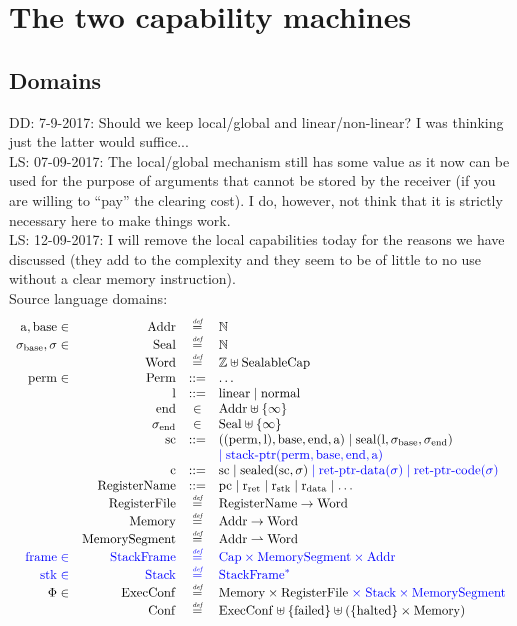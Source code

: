 \documentclass[a4paper]{article}
\newcommand\lau[1]{{\color{purple} \sf \footnotesize {LS: #1}}\\}
\newcommand\dominique[1]{{\color{purple} \sf \footnotesize {DD: #1}}\\}
\newcommand{\defeq}{\stackrel{\textit{\tiny{def}}}{=}}
\newcommand{\defbnf}{::=}
\newcommand{\fun}{\rightarrow}
\newcommand{\parfun}{\rightharpoonup}
\newcommand{\sourcecolor}[1]{\color{blue}}
\newcommand{\src}[1]{{\sourcecolor{} #1}}
\newcommand{\nats}{\mathbb{N}}
\newcommand{\ints}{\mathbb{Z}}
\newcommand{\shareddom}[1]{\mathrm{#1}}
\newcommand{\RegName}{\shareddom{RegisterName}}
\newcommand{\Addr}{\shareddom{Addr}}
\newcommand{\Seal}{\shareddom{Seal}}
\newcommand{\Perm}{\shareddom{Perm}}
\newcommand{\Caps}{\shareddom{Cap}}
\newcommand{\SealableCaps}{\shareddom{SealableCap}}
\newcommand{\Word}{\shareddom{Word}}
\newcommand{\Mem}{\shareddom{Memory}}
\newcommand{\Reg}{\shareddom{RegisterFile}}
\newcommand{\Conf}{\shareddom{Conf}}
\newcommand{\ExecConf}{\shareddom{ExecConf}}
\newcommand{\MemSeg}{\shareddom{MemorySegment}}
\newcommand{\StkFrame}{\shareddom{StackFrame}}
\newcommand{\Stack}{\shareddom{Stack}}
\newcommand{\scbnf}{\shareddom{sc}}
\newcommand{\cbnf}{\shareddom{c}}
\newcommand{\permbnf}{\shareddom{perm}}
\newcommand{\addrbnf}{\shareddom{a}}
\newcommand{\basebnf}{\shareddom{base}}
\newcommand{\aendbnf}{\shareddom{end}}
\newcommand{\linbnf}{\shareddom{l}}
\newcommand{\sealbasebnf}{\sigma_\shareddom{base}}
\newcommand{\sealendbnf}{\sigma_\shareddom{end}}
\newcommand{\sstk}{\shareddom{stk}}
\newcommand{\sstkframe}{\shareddom{frame}}
\newcommand{\stkptr}[1]{\mathrm{stack\text{-}ptr}(#1)}
\newcommand{\retptrd}{\mathrm{ret\text{-}ptr\text{-}data}}
\newcommand{\retptrc}{\mathrm{ret\text{-}ptr\text{-}code}}
\newcommand{\seal}[1]{\shareddom{seal}(#1)}
\newcommand{\sealed}[1]{\shareddom{sealed}(#1)}
\newcommand{\failed}{\mathrm{failed}}
\newcommand{\halted}{\mathrm{halted}}
\newcommand{\pcreg}{\mathrm{pc}}
\newcommand{\rstk}{\mathrm{r}_\mathrm{stk}}
\newcommand{\rO}{\mathrm{r}_\mathrm{ret}}
\newcommand{\rret}{\rO}
\newcommand{\rdata}{\mathrm{r}_\mathrm{data}}
\newcommand{\plainlinearity}[1]{\mathrm{#1}}
\newcommand{\linear}{\plainlinearity{linear}}
\newcommand{\normal}{\plainlinearity{normal}}
\begin{document}
\section{The two capability machines}
\subsection{Domains}
\label{sec:domains}

\dominique{7-9-2017: Should we keep local/global and linear/non-linear?  I was thinking just the latter would suffice...}
\lau{07-09-2017: The local/global mechanism still has some value as it now can be used for the purpose of arguments that cannot be stored by the receiver (if you are willing to ``pay'' the clearing cost). I do, however, not think that it is strictly necessary here to make things work.}
\lau{12-09-2017: I will remove the local capabilities today for the reasons we have discussed (they add to the complexity and they seem to be of little to no use without a clear memory instruction).}
Source language domains:
\[
  \begin{array}{rrcl}
   \addrbnf,\basebnf \in & \Addr & \defeq & \nats \\
    \sealbasebnf, \sigma \in & \Seal & \defeq & \nats \\
    &\Word & \defeq & \ints \uplus \SealableCaps\\
    \permbnf \in& \Perm & \defbnf & \dots \\
    &\linbnf & \defbnf & \linear \mid \normal \\
    &\aendbnf & \in & \Addr \uplus \{\infty \} \\
    &\sealendbnf & \in & \Seal \uplus \{\infty \} \\
    &\scbnf &\defbnf & ((\permbnf,\linbnf),\basebnf,\aendbnf,\addrbnf) \mid \seal{\linbnf,\sealbasebnf,\sealendbnf}\\
    & & & {\sourcecolor{} \mid \stkptr{\permbnf,\basebnf,\aendbnf,\addrbnf}}\\ 
    &\cbnf & \defbnf &  \scbnf \mid \sealed{\scbnf,\sigma}{\sourcecolor{} \; \mid \retptrd(\sigma) \mid \retptrc(\sigma)}\\ 
    &\RegName & \defbnf &\pcreg \mid \rret \mid \rstk \mid \rdata \mid \dots \\
    &\Reg & \defeq & \RegName \fun \Word\\
    &\Mem & \defeq & \Addr \fun \Word \\
    &\MemSeg & \defeq & \Addr \parfun \Word \\
    {\sourcecolor{} \sstkframe \in} & {\sourcecolor{} \StkFrame} & {\sourcecolor{} \defeq} & {\sourcecolor{} \Caps \times \MemSeg \times \Addr}\\
    \src{\sstk \in}& \src{ \Stack} & \src{ \defeq} & \src{ \StkFrame^*} \\
    \Phi \in & \ExecConf & \defeq & \Mem \times \Reg {\sourcecolor{} \; \times \; \Stack \times \MemSeg }\\
    &\Conf & \defeq & \ExecConf \uplus \{\failed\} \uplus (\{\halted\} \times \Mem)
  \end{array}
\]
\end{document}
